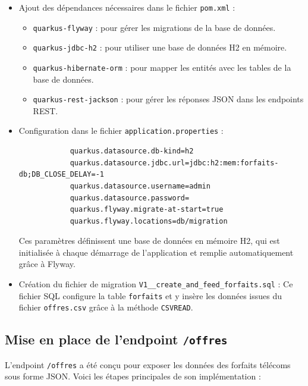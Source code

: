 \documentclass{article}
\begin{document}
	\begin{itemize}
		\item Ajout des dépendances nécessaires dans le fichier \texttt{pom.xml} :
		\begin{itemize}
			\item \texttt{quarkus-flyway} : pour gérer les migrations de la base de données.
			\item \texttt{quarkus-jdbc-h2} : pour utiliser une base de données H2 en mémoire.
			\item \texttt{quarkus-hibernate-orm} : pour mapper les entités avec les tables de la base de données.
			\item \texttt{quarkus-rest-jackson} : pour gérer les réponses JSON dans les endpoints REST.
		\end{itemize}
		
		\item Configuration dans le fichier \texttt{application.properties} :
		\begin{verbatim}
			quarkus.datasource.db-kind=h2
			quarkus.datasource.jdbc.url=jdbc:h2:mem:forfaits-db;DB_CLOSE_DELAY=-1
			quarkus.datasource.username=admin
			quarkus.datasource.password=
			quarkus.flyway.migrate-at-start=true
			quarkus.flyway.locations=db/migration
		\end{verbatim}
		
		Ces paramètres définissent une base de données en mémoire H2, qui est initialisée à chaque démarrage de l'application et remplie  automatiquement grâce à Flyway.
		
		\item Création du fichier de migration \texttt{V1\_\_create\_and\_feed\_forfaits.sql} :
		Ce fichier SQL configure la table \texttt{forfaits} et y insère les données issues du fichier \texttt{offres.csv} grâce à la méthode \texttt{CSVREAD}.
	\end{itemize}
	
	\subsection{Mise en place de l'endpoint \texttt{/offres}}
	
	L'endpoint \texttt{/offres} a été conçu pour exposer les données des forfaits télécoms sous forme JSON. Voici les étapes principales de son implémentation :
\end{document}
